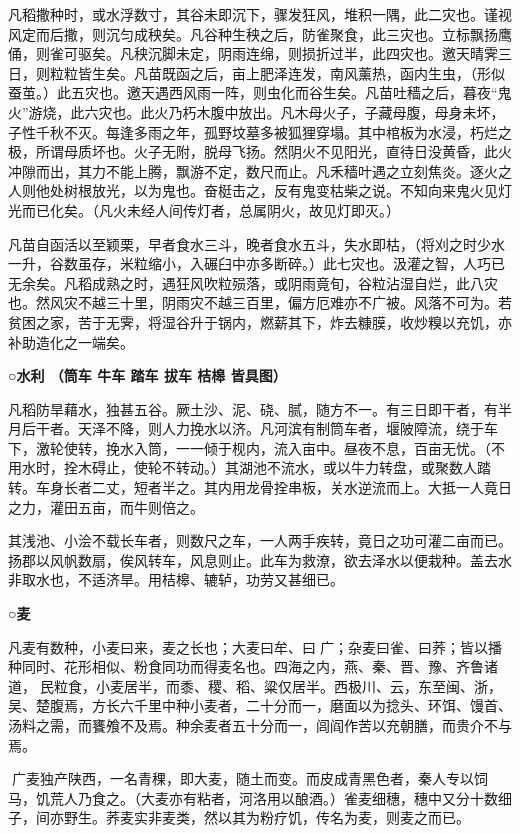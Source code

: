 \documentclass[]{article}
\begin{document}
凡稻撒种时，或水浮数寸，其谷未即沉下，骤发狂风，堆积一隅，此二灾也。谨视风定而后撒，则沉匀成秧矣。凡谷种生秧之后，防雀聚食，此三灾也。立标飘扬鹰俑，则雀可驱矣。凡秧沉脚未定，阴雨连绵，则损折过半，此四灾也。邀天晴霁三日，则粒粒皆生矣。凡苗既函之后，亩上肥泽连发，南风薰热，函内生虫，（形似蚕茧。）此五灾也。邀天遇西风雨一阵，则虫化而谷生矣。凡苗吐穑之后，暮夜``鬼火''游烧，此六灾也。此火乃朽木腹中放出。凡木母火子，子藏母腹，母身未坏，子性千秋不灭。每逢多雨之年，孤野坟墓多被狐狸穿塌。其中棺板为水浸，朽烂之极，所谓母质坏也。火子无附，脱母飞扬。然阴火不见阳光，直待日没黄昏，此火冲隙而出，其力不能上腾，飘游不定，数尺而止。凡禾穑叶遇之立刻焦炎。逐火之人则他处树根放光，以为鬼也。奋梃击之，反有鬼变枯柴之说。不知向来鬼火见灯光而已化矣。（凡火未经人间传灯者，总属阴火，故见灯即灭。）

凡苗自函活以至颖栗，早者食水三斗，晚者食水五斗，失水即枯，（将刈之时少水一升，谷数虽存，米粒缩小，入碾臼中亦多断碎。）此七灾也。汲灌之智，人巧已无余矣。凡稻成熟之时，遇狂风吹粒殒落，或阴雨竟旬，谷粒沾湿自烂，此八灾也。然风灾不越三十里，阴雨灾不越三百里，偏方厄难亦不广被。风落不可为。若贫困之家，苦于无霁，将湿谷升于锅内，燃薪其下，炸去糠膜，收炒糗以充饥，亦补助造化之一端矣。

\textbf{○水利 （筒车 牛车 踏车 拔车 桔槔 皆具图）}

凡稻防旱藉水，独甚五谷。厥土沙、泥、硗、腻，随方不一。有三日即干者，有半月后干者。天泽不降，则人力挽水以济。凡河滨有制筒车者，堰陂障流，绕于车下，激轮使转，挽水入筒，一一倾于枧内，流入亩中。昼夜不息，百亩无忧。（不用水时，拴木碍止，使轮不转动。）其湖池不流水，或以牛力转盘，或聚数人踏转。车身长者二丈，短者半之。其内用龙骨拴串板，关水逆流而上。大抵一人竟日之力，灌田五亩，而牛则倍之。

其浅池、小浍不载长车者，则数尺之车，一人两手疾转，竟日之功可灌二亩而已。扬郡以风帆数扇，俟风转车，风息则止。此车为救潦，欲去泽水以便栽种。盖去水非取水也，不适济旱。用桔槔、辘轳，功劳又甚细已。

\textbf{○麦}

凡麦有数种，小麦曰来，麦之长也；大麦曰牟、曰广；杂麦曰雀、曰荞；皆以播种同时、花形相似、粉食同功而得麦名也。四海之内，燕、秦、晋、豫、齐鲁诸道，民粒食，小麦居半，而黍、稷、稻、粱仅居半。西极川、云，东至闽、浙，吴、楚腹焉，方长六千里中种小麦者，二十分而一，磨面以为捻头、环饵、馒首、汤料之需，而饔飧不及焉。种余麦者五十分而一，闾阎作苦以充朝膳，而贵介不与焉。

广麦独产陕西，一名青稞，即大麦，随土而变。而皮成青黑色者，秦人专以饲马，饥荒人乃食之。（大麦亦有粘者，河洛用以酿酒。）雀麦细穗，穗中又分十数细子，间亦野生。荞麦实非麦类，然以其为粉疗饥，传名为麦，则麦之而已。
\end{document}
